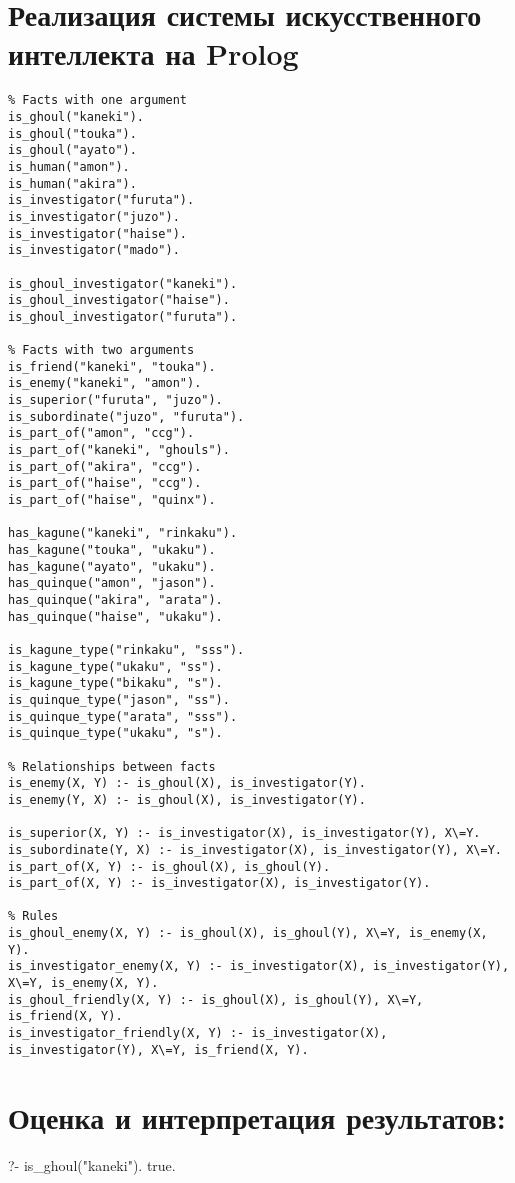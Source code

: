 \section{Реализация системы искусственного интеллекта на Prolog}
\begin{verbatim}
% Facts with one argument
is_ghoul("kaneki").
is_ghoul("touka").
is_ghoul("ayato").
is_human("amon").
is_human("akira").
is_investigator("furuta").
is_investigator("juzo").
is_investigator("haise").
is_investigator("mado").

is_ghoul_investigator("kaneki").
is_ghoul_investigator("haise").
is_ghoul_investigator("furuta").

% Facts with two arguments
is_friend("kaneki", "touka").
is_enemy("kaneki", "amon").
is_superior("furuta", "juzo").
is_subordinate("juzo", "furuta").
is_part_of("amon", "ccg").
is_part_of("kaneki", "ghouls").
is_part_of("akira", "ccg").
is_part_of("haise", "ccg").
is_part_of("haise", "quinx").

has_kagune("kaneki", "rinkaku").
has_kagune("touka", "ukaku").
has_kagune("ayato", "ukaku").
has_quinque("amon", "jason").
has_quinque("akira", "arata").
has_quinque("haise", "ukaku").

is_kagune_type("rinkaku", "sss").
is_kagune_type("ukaku", "ss").
is_kagune_type("bikaku", "s").
is_quinque_type("jason", "ss").
is_quinque_type("arata", "sss").
is_quinque_type("ukaku", "s").

% Relationships between facts
is_enemy(X, Y) :- is_ghoul(X), is_investigator(Y).
is_enemy(Y, X) :- is_ghoul(X), is_investigator(Y).

is_superior(X, Y) :- is_investigator(X), is_investigator(Y), X\=Y.
is_subordinate(Y, X) :- is_investigator(X), is_investigator(Y), X\=Y.
is_part_of(X, Y) :- is_ghoul(X), is_ghoul(Y).
is_part_of(X, Y) :- is_investigator(X), is_investigator(Y).

% Rules
is_ghoul_enemy(X, Y) :- is_ghoul(X), is_ghoul(Y), X\=Y, is_enemy(X, Y).
is_investigator_enemy(X, Y) :- is_investigator(X), is_investigator(Y), X\=Y, is_enemy(X, Y).
is_ghoul_friendly(X, Y) :- is_ghoul(X), is_ghoul(Y), X\=Y, is_friend(X, Y).
is_investigator_friendly(X, Y) :- is_investigator(X), is_investigator(Y), X\=Y, is_friend(X, Y).

\end{verbatim}


\section{Оценка и интерпретация результатов:}
?- is_ghoul("kaneki").
true.

